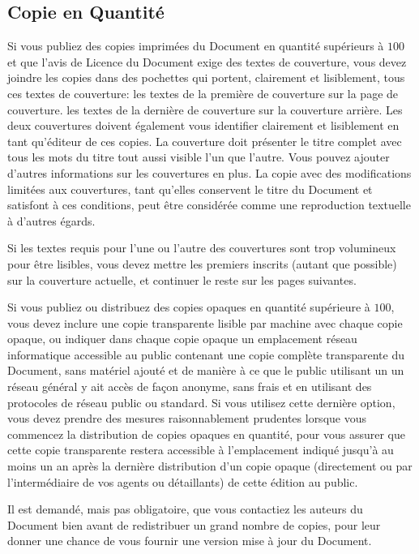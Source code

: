	\subsection{Copie en Quantit\'e}
	Si vous publiez des copies imprim\'ees du Document en quantit\'e sup\'erieurs à $100$ et que l'avis de Licence du Document exige des textes de couverture, vous devez joindre les copies dans des pochettes qui portent, clairement et lisiblement, tous ces textes de couverture: les textes de la première de couverture sur la page de couverture. les textes de la dernière de couverture sur la couverture arrière. Les deux couvertures doivent \'egalement vous identifier clairement et lisiblement en tant qu'\'editeur de ces copies. La couverture doit pr\'esenter le titre complet avec tous les mots du titre tout aussi visible l'un que l'autre. Vous pouvez ajouter d'autres informations sur les couvertures en plus. La copie avec des modifications limit\'ees aux couvertures, tant qu'elles conservent le titre du Document et satisfont à ces conditions, peut être consid\'er\'ee comme une reproduction textuelle à d'autres \'egards.

	Si les textes requis pour l'une ou l'autre des couvertures sont trop volumineux pour être lisibles, vous devez mettre les premiers inscrits (autant que possible) sur la couverture actuelle, et continuer le reste sur les pages suivantes.

	Si vous publiez ou distribuez des copies opaques en quantit\'e sup\'erieure à $100$, vous devez inclure une copie transparente lisible par machine avec chaque copie opaque, ou indiquer dans chaque copie opaque un emplacement r\'eseau informatique accessible au public contenant une copie complète transparente du Document, sans mat\'eriel ajout\'e et de manière à ce que le public utilisant un un r\'eseau g\'en\'eral y ait accès de façon anonyme, sans frais et en utilisant des protocoles de r\'eseau public ou standard. Si vous utilisez cette dernière option, vous devez prendre des mesures raisonnablement prudentes lorsque vous commencez la distribution de copies opaques en quantit\'e, pour vous assurer que cette copie transparente restera accessible à l'emplacement indiqu\'e jusqu'à au moins un an après la dernière distribution d'un copie opaque (directement ou par l'interm\'ediaire de vos agents ou d\'etaillants) de cette \'edition au public.

	Il est demand\'e, mais pas obligatoire, que vous contactiez les auteurs du Document bien avant de redistribuer un grand nombre de copies, pour leur donner une chance de vous fournir une version mise à jour du Document.


